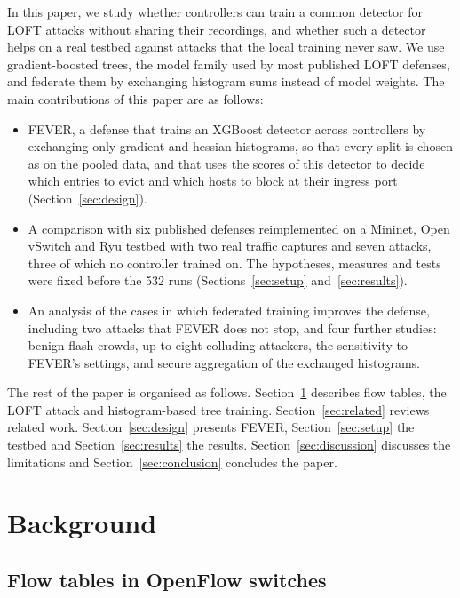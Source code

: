 \documentclass[conference]{IEEEtran}
\begin{document}
In this paper, we study whether controllers can train a common detector for LOFT attacks without sharing
their recordings, and whether such a detector helps on a real testbed against attacks that the local
training never saw. We use gradient-boosted trees, the model family used by most published LOFT
defenses, and federate them by exchanging histogram sums instead of model weights. The main
contributions of this paper are as follows:
\begin{itemize}
\item FEVER, a defense that trains an XGBoost detector across controllers by exchanging only gradient and
  hessian histograms, so that every split is chosen as on the pooled data, and that uses the scores of this detector to
  decide which entries to evict and which hosts to block at their ingress port
  (Section~\ref{sec:design}).
\item A comparison with six published defenses reimplemented on a Mininet, Open vSwitch and Ryu testbed
  with two real traffic captures and seven attacks, three of which no controller trained on. The
  hypotheses, measures and tests were fixed before the 532 runs (Sections~\ref{sec:setup}
  and~\ref{sec:results}).
\item An analysis of the cases in which federated training improves the defense, including two attacks
  that FEVER does not stop, and four further studies: benign flash crowds, up to eight colluding
  attackers, the sensitivity to FEVER's settings, and secure aggregation of the exchanged histograms.
\end{itemize}

The rest of the paper is organised as follows. Section~\ref{sec:background} describes flow tables, the
LOFT attack and histogram-based tree training. Section~\ref{sec:related} reviews related work.
Section~\ref{sec:design} presents FEVER, Section~\ref{sec:setup} the testbed and
Section~\ref{sec:results} the results. Section~\ref{sec:discussion} discusses the limitations and
Section~\ref{sec:conclusion} concludes the paper.

\section{Background}
\label{sec:background}

\subsection{Flow tables in OpenFlow switches}
\end{document}
